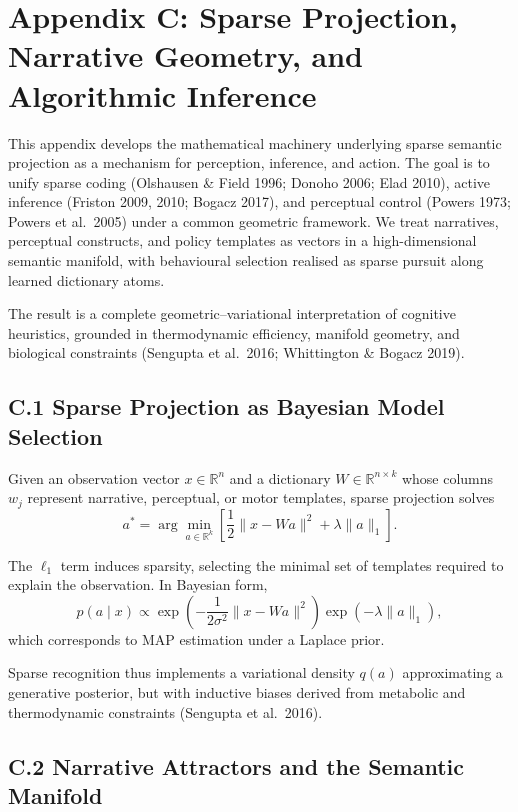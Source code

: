 \documentclass[11pt,a4paper,twoside]{article}
\begin{document}
\section*{Appendix C: Sparse Projection, Narrative Geometry, and Algorithmic Inference}

This appendix develops the mathematical machinery underlying sparse semantic projection as a mechanism for perception, inference, and action. The goal is to unify sparse coding (Olshausen \& Field 1996; Donoho 2006; Elad 2010), active inference (Friston 2009, 2010; Bogacz 2017), and perceptual control (Powers 1973; Powers et al.\ 2005) under a common geometric framework. We treat narratives, perceptual constructs, and policy templates as vectors in a high-dimensional semantic manifold, with behavioural selection realised as sparse pursuit along learned dictionary atoms.

The result is a complete geometric–variational interpretation of cognitive heuristics, grounded in thermodynamic efficiency, manifold geometry, and biological constraints (Sengupta et al.\ 2016; Whittington \& Bogacz 2019).

\subsection*{C.1 Sparse Projection as Bayesian Model Selection}

Given an observation vector $x \in \mathbb{R}^n$ and a dictionary $W \in \mathbb{R}^{n \times k}$ whose columns $w_j$ represent narrative, perceptual, or motor templates, sparse projection solves
\[
a^\ast = \arg\min_{a \in \mathbb{R}^k}
\left[
\frac{1}{2}\|x - Wa\|^2 + \lambda \|a\|_1
\right].
\]

The $\ell_1$ term induces sparsity, selecting the minimal set of templates required to explain the observation. In Bayesian form,
\[
p(a \mid x) \propto \exp\left(-\frac{1}{2\sigma^2}\|x - Wa\|^2\right) \exp(-\lambda \|a\|_1),
\]
which corresponds to MAP estimation under a Laplace prior.

Sparse recognition thus implements a variational density $q(a)$ approximating a generative posterior, but with inductive biases derived from metabolic and thermodynamic constraints (Sengupta et al.\ 2016).

\subsection*{C.2 Narrative Attractors and the Semantic Manifold}
\end{document}
